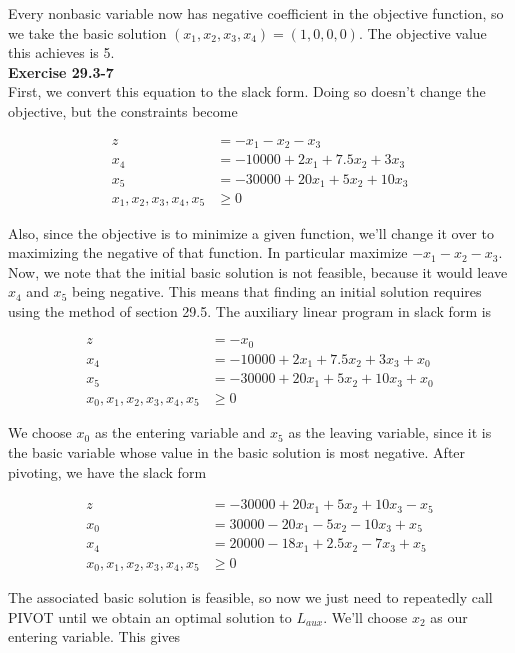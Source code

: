 \documentclass{article}
\begin{document}
Every nonbasic variable now has negative coefficient in the objective function, so we take the basic solution $(x_1,x_2,x_3,x_4) = (1,0,0,0)$. The objective value this achieves is 5. \\


\noindent\textbf{Exercise 29.3-7}\\

First, we convert this equation to the slack form. Doing so doesn't change the objective, but the constraints become

\begin{align*}
z &= -x_1-x_2-x_3\\
x_4 & = -10000 + 2x_1 + 7.5x_2 + 3x_3\\
x_5 & = -30000 + 20x_1 + 5x_2 + 10x_3 \\
x_1,x_2,x_3,x_4,x_5 &\ge 0
\end{align*}

Also, since the objective is to minimize a given function, we'll change it over to maximizing the negative of that function. In particular maximize $-x_1 -x_2 -x_3$. Now, we note that the initial basic solution is not feasible, because it would leave $x_4$ and $x_5$ being negative. This means that finding an initial solution requires using the method of section 29.5. The auxiliary linear program in slack form is

\begin{align*}
z &=-x_0\\ 
x_4 & = -10000 + 2x_1 + 7.5x_2 + 3x_3 + x_0\\
x_5 & = -30000 + 20x_1 + 5x_2 + 10x_3 + x_0 \\
x_0,x_1,x_2,x_3,x_4,x_5 &\ge 0
\end{align*}

We choose $x_0$ as the entering variable and $x_5$ as the leaving variable, since it is the basic variable whose value in the basic solution is most negative.  After pivoting, we have the slack form 

\begin{align*}
z &=-30000 + 20x_1 + 5x_2 + 10x_3 - x_5\\ 
x_0 & = 30000 - 20x_1 - 5x_2 - 10x_3 + x_5\\
x_4 &= 20000 - 18x_1 + 2.5x_2 - 7x_3 + x_5\\
x_0,x_1,x_2,x_3,x_4,x_5 &\ge 0
\end{align*}

The associated basic solution is feasible, so now we just need to repeatedly call PIVOT until we obtain an optimal solution to $L_{aux}$.  We'll choose $x_2$ as our entering variable.  This gives 
\end{document}
